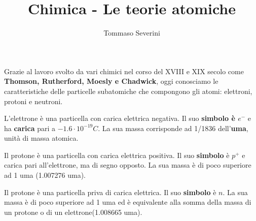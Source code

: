 \documentclass[10pt,a4paper]{article}
\author{Tommaso Severini}
\title{Chimica - Le teorie atomiche}
\begin{document}
	
	
	
	\maketitle
	
	Grazie al lavoro svolto da vari chimici nel corso del XVIII e XIX secolo come \textbf{Thomson, Rutherford, Moesly e Chadwick}, oggi conosciamo le caratteristiche delle particelle subatomiche che compongono gli atomi: elettroni, protoni e neutroni.
	
	\begin{definitionblue}[L'elettrone]
		L'elettrone è una particella con carica elettrica negativa. Il suo \textbf{simbolo è $e^-$} e ha \textbf{carica} pari a $-1.6 \cdot 10^{-19} C$. La sua massa corrisponde ad 1/1836 dell'\textbf{uma}, unità di massa atomica.
	\end{definitionblue}

	\begin{definitionred}[Il protone]
		Il protone è una particella con carica elettrica positiva. Il suo \textbf{simbolo} è $p^+$ e carica pari all'elettrone, ma di segno opposto. La sua massa è di poco superiore ad 1 uma (1.007276 uma).
	\end{definitionred}

	\begin{definitiongreen}[Il neutrone]
		Il protone è una particella priva di carica elettrica. Il suo \textbf{simbolo} è $n$. La sua massa è di poco superiore ad 1 uma ed è equivalente alla somma della massa di un protone o di un elettrone(1.008665 uma).
	\end{definitiongreen}
	
\end{document}
